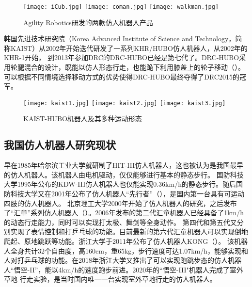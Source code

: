 \begin{figure}[htbp]
    \centering
        {%
            \texttt{[image: iCub.jpg]}}
        {%
            \texttt{[image: coman.jpg]}}
        {%
            \texttt{[image: walkman.jpg]}}            
    \caption{Agility Robotics研发的两款仿人机器人产品\label{fig:iit_biped}}
\end{figure}
韩国先进技术研究院（Korea Advanced Institute of Science and Technology，简称KAIST）从2002年开始迭代研发了一系列KHR/HUBO仿人机器人，从2002年的KHR-1开始，
到2013年参加DRC的DRC-HUBO已经是第七代了。DRC-HUBO采用轮腿混合的设计，既能以仿人形态行走，也能跪下利用膝盖上的轮子移动\cite{zucker2015general}（）。
可以根据不同情境选择移动方式的优势使得DRC-HUBO最终夺得了DRC2015的冠军。

\begin{figure}[htbp]
    \centering
    \texttt{[image: kaist1.jpg]}
    \texttt{[image: kaist2.jpg]}
    \texttt{[image: kaist3.jpg]}
    \caption{\label{fig:kaist_hubo}KAIST-HUBO机器人及其多种运动形态}
\end{figure}
\subsection{我国仿人机器人研究现状}
早在1985年哈尔滨工业大学就研制了HIT-III仿人机器人，这也被认为是我国最早的仿人机器人\cite{谢涛2002}。该机器人由电机驱动，仅仅能够进行基本的静态步行。
国防科技大学1995年公布的KDW-III仿人机器人也仅能实现0.36km/h的静态步行。随后国防科技大学又在2001年公布了仿人机器人“先行者”（），是国内第一台具有可运动四肢的仿人机器人。
北京理工大学2000年开始了仿人机器人的研究，之后发布了“汇童”系列仿人机器人（）。2006年发布的第二代汇童机器人已经具备了1km/h的动态行走能力，同时可以实现打太极、舞剑等全身动作。
第四代和第五代又分别实现了表情控制和打乒乓球的功能。目前最新的第六代汇童机器人可以实现倒地爬起、原地跳跃等功能\cite{huang2019historical}。浙江大学于2011年公布了仿人机器人KONG\cite{sun2011balance}（）。
该机器人全身共计32个自由度，高160cm，重65kg，步行速度可达1.07km/h，能够实现和人对打乒乓球的功能。在2018年浙江大学又推出了可以实现跑跳步态的仿人机器人“悟空-II”，能以4km/h的速度跑步前进。2020年的“悟空-III"机器人完成了室外草地
行走实验，是当时国内唯一一台实现室外草地行走的仿人机器人。

